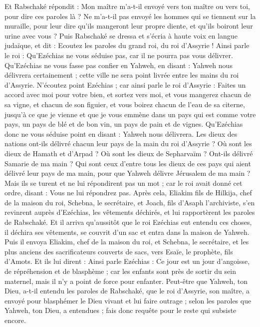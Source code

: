 \begin{multicols}{2}
Et Rabschaké répondit : Mon maître m'a-t-il envoyé vers ton maître ou vers toi, pour dire ces paroles là ? Ne m'a-t-il pas envoyé les hommes qui se tiennent sur la muraille, pour leur dire qu'ils mangeront leur propre diente, et qu'ils boiront leur urine avec vous ?
Puis Rabschaké se dressa et s'écria à haute voix en langue judaïque, et dit : Ecoutez les paroles du grand roi, du roi d'Assyrie !
Ainsi parle le roi : Qu'Ezéchias ne vous séduise pas, car il ne pourra pas vous délivrer.
Qu'Ezéchias ne vous fasse pas confier en Yahweh, en disant : Yahweh nous délivrera certainement ; cette ville ne sera point livrée entre les mains du roi d'Assyrie.
N'écoutez point Ezéchias ; car ainsi parle le roi d'Assyrie : Faites un accord avec moi pour votre bien, et sortez vers moi, et vous mangerez chacun  de sa vigne, et chacun de son figuier, et vous boirez chacun de l'eau de sa citerne,
jusqu'à ce que je vienne et que je vous emmène dans un pays qui est comme votre pays, un pays de blé et de bon vin, un pays de pain et de vignes.
Qu'Ezéchias donc ne vous séduise point en disant : Yahweh nous délivrera. Les dieux des nations ont-ils délivré chacun leur pays de la main du roi d'Assyrie ?
Où sont les dieux de Hamath et d'Arpad ? Où sont les dieux de Sepharvaïm ? Ont-ils délivré Samarie de ma main ?
Qui sont ceux d'entre tous les dieux de ces pays qui aient délivré leur pays de ma main, pour que Yahweh délivre Jérusalem de ma main ?
Mais ils se turent et ne lui répondirent pas un mot ; car le roi avait donné cet ordre, disant : Vous ne lui répondrez pas.
Après cela, Eliakim fils de Hilkija, chef de la maison du roi, Schebna, le secrétaire, et Joach, fils d'Asaph l'archiviste, s'en revinrent auprès d'Ezéchias, les vêtements déchirés, et lui rapportèrent les paroles de Rabschaké.
\VerseOne{}Et il arriva qu'aussitôt que le roi Ezéchias eut entendu ces choses, il déchira ses vêtements, se couvrit d'un sac et entra dans la maison de Yahweh.
Puis il envoya Eliakim, chef de la maison du roi, et Schebna, le secrétaire, et les plus anciens des sacrificateurs couverts de sacs, vers Esaïe, le prophète, fils d'Amots.
Et ils lui dirent : Ainsi parle Ezéchias : Ce jour est un jour d'angoisse, de répréhension et de blasphème ; car les enfants sont près de sortir du sein maternel, mais il n'y a point de force pour enfanter.
Peut-être que Yahweh, ton Dieu, a-t-il entendu les paroles de Rabschaké, que le roi d'Assyrie, son maître, a envoyé pour blasphémer le Dieu vivant et lui faire outrage ; selon les paroles que Yahweh, ton Dieu, a entendues ; fais donc requête pour le reste qui subsiste encore.

\end{multicols}
